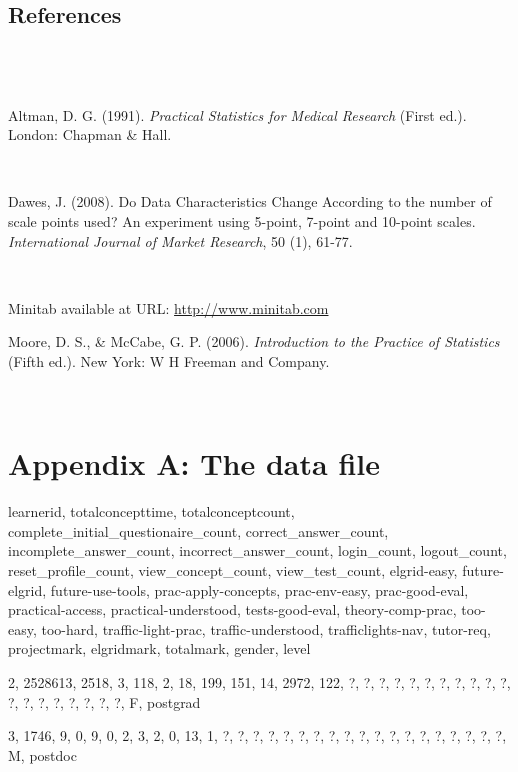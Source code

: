 \documentclass[12pt,twoside]{article}
\begin{document}
~ 

\subsection[References ]{\rmfamily \newline
References }
\subsection{~ }
Altman, D. G. (1991). \textit{Practical Statistics for Medical Research}
(First ed.). London: Chapman \& Hall. 

~ 

Dawes, J. (2008). Do Data Characteristics Change According to the number
of scale points used? An experiment using 5{}-point, 7{}-point and
10{}-point scales. \textit{International Journal of Market Research},
50 (1), 61{}-77.

~ 

Minitab available at URL:
\href{http://www.minitab.com/}{http://www.minitab.com}

Moore, D. S., \& McCabe, G. P. (2006). \textit{Introduction to the
Practice of Statistics} (Fifth ed.). New York: W H Freeman and Company.


\newline
~ 

\section[Appendix A: The data file ]{\rmfamily Appendix A: The data file
}

\bigskip

learnerid, totalconcepttime, totalconceptcount,
complete\_initial\_questionaire\_count, correct\_answer\_count,
incomplete\_answer\_count, incorrect\_answer\_count, login\_count,
logout\_count, reset\_profile\_count, view\_concept\_count,
view\_test\_count, elgrid{}-easy, future{}-elgrid,
future{}-use{}-tools, prac{}-apply{}-concepts, prac{}-env{}-easy,
prac{}-good{}-eval, practical{}-access, practical{}-understood,
tests{}-good{}-eval, theory{}-comp{}-prac, too{}-easy, too{}-hard,
traffic{}-light{}-prac, traffic{}-understood, trafficlights{}-nav,
tutor{}-req, projectmark, elgridmark, totalmark, gender, level

2, 2528613, 2518, 3, 118, 2, 18, 199, 151, 14, 2972, 122, ?, ?, ?, ?, ?,
?, ?, ?, ?, ?, ?, ?, ?, ?, ?, ?, ?, ?, ?, F, postgrad

3, 1746, 9, 0, 9, 0, 2, 3, 2, 0, 13, 1, ?, ?, ?, ?, ?, ?, ?, ?, ?, ?, ?,
?, ?, ?, ?, ?, ?, ?, ?, M, postdoc
\end{document}
